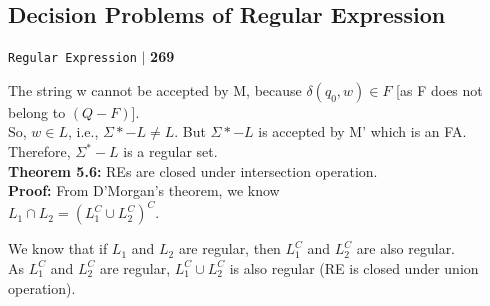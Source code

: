 \documentclass[8pt]{beamer}
\begin{document}
\begin{frame}
\section*{Decision Problems of Regular Expression}
\begin{flushright}
 \texttt{Regular Expression} \hspace*{0.1cm}\textbf{$|$} \hspace*{0.1cm} \textbf{269}\hspace*{0.1cm}
\end{flushright}

\vspace*{0.5cm}
\hspace*{0.5cm} The string w cannot be accepted by M, because $\delta(q_0, w)\in F$ [as F does not belong to $(Q - F)$].\\
\hspace*{0.5cm} So, $w \in L$, i.e., $\Sigma * - L \neq L$. But $\Sigma * - L$ is accepted by M' which is an FA.\\
\hspace*{0.5cm} Therefore, $\Sigma^* - L$ is a regular set.\\

\vspace*{0.3cm}
\textbf{Theorem 5.6:} REs are closed under intersection operation.\\

\vspace*{0.1cm}
\textbf{Proof:} From D’Morgan’s theorem, we know\\

\hspace*{4cm} $L_1 \cap L_2 = (L_1^C \cup L_2^C)^C.$

\hspace*{0.5cm} We know that if $L_1$ and $L_2$ are regular, then $L_1^C$ and $L_2^C$ are also regular.\\
\hspace*{0.5cm} As $L_1^C$ and $L_2^C$ are regular, $L_1^C \cup L_2^C$ is also regular (RE is closed under union operation).\\

\end{frame}
\end{document}
